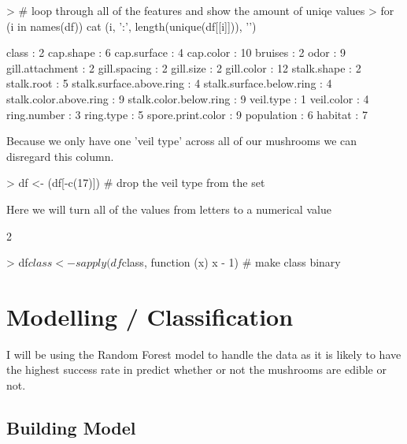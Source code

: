 \documentclass[12pt]{article}         %
\begin{document}
\begin{Schunk}
\begin{Sinput}
> # loop through all of the features and show the amount of uniqe values
> for (i in names(df)) { cat (i, ':', length(unique(df[[i]])), '\n')}
\end{Sinput}
\begin{Soutput}
class : 2 
cap.shape : 6 
cap.surface : 4 
cap.color : 10 
bruises : 2 
odor : 9 
gill.attachment : 2 
gill.spacing : 2 
gill.size : 2 
gill.color : 12 
stalk.shape : 2 
stalk.root : 5 
stalk.surface.above.ring : 4 
stalk.surface.below.ring : 4 
stalk.color.above.ring : 9 
stalk.color.below.ring : 9 
veil.type : 1 
veil.color : 4 
ring.number : 3 
ring.type : 5 
spore.print.color : 9 
population : 6 
habitat : 7 
\end{Soutput}
\end{Schunk}
Because we only have one 'veil type' across all of our mushrooms we can disregard this column.
\begin{Schunk}
\begin{Sinput}
> df <- (df[-c(17)]) # drop the veil type from the set
\end{Sinput}
\end{Schunk}

Here we will turn all of the values from letters to a numerical value
\begin{Schunk}
\begin{Soutput}
[1] 2
\end{Soutput}
\begin{Sinput}
> df$class <- sapply(df$class, function (x) x - 1) # make class binary
\end{Sinput}
\end{Schunk}


\section{Modelling / Classification}
I will be using the Random Forest model to handle the data as it is likely to have the highest success rate in predict whether or not the mushrooms are edible or not.

\subsection{Building Model}
\end{document}
